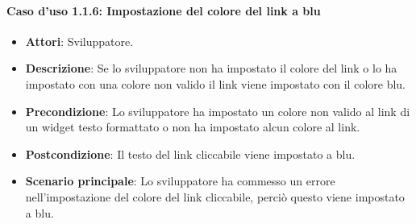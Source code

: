 \paragraph{Caso d'uso 1.1.6: Impostazione del colore del link a blu}
\begin{itemize}
\item\textbf{Attori}: Sviluppatore.
\item\textbf{Descrizione}: Se lo sviluppatore non ha impostato il colore del link o lo ha impostato con una colore non valido il link viene impostato con il colore blu.
\item\textbf{Precondizione}: Lo sviluppatore ha impostato un colore non valido al link di un widget testo formattato o non ha impostato alcun colore al link.
\item\textbf{Postcondizione}: Il testo del link cliccabile viene impostato a blu.
\item\textbf{Scenario principale}: Lo sviluppatore ha commesso un errore nell'impostazione del colore del link cliccabile, perciò questo viene impostato a blu.
\end{itemize}